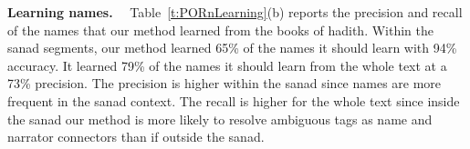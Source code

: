 \documentclass{llncs}
\begin{document}

\begin{table}[bt]                                     
\centering                                            
\caption{Narrator graph and name learning results.}
\normalsize                   
\label{t:PORnLearning} 
\end{table} 

{\bf Learning names.}~~
Table~\ref{t:PORnLearning}(b) reports the precision and recall of the names that our method learned from the 
books of hadith. 
Within the sanad segments, our method learned 65\% of the names it should learn with 94\% accuracy.
It learned 79\% of the names it should learn from the whole text at a 73\% precision. 
The precision is higher within the sanad since names are more frequent in the sanad context.
The recall is higher for the whole text since inside the sanad our method is more likely to resolve ambiguous tags 
as name and narrator connectors than if outside the sanad.
\end{document}
